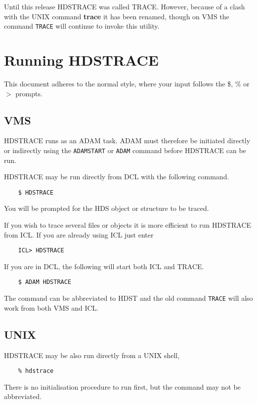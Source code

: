 Until this release {\footnotesize HDSTRACE} was called {\footnotesize
TRACE}. However, because of a clash with the UNIX command {\bf trace} it
has been renamed, though on VMS the command {\tt TRACE} will continue to
invoke this utility. 


\section{Running HDSTRACE}
This document adheres to the normal style, where your input follows
the \$, \% or $>$ prompts.

\subsection{VMS}
{\footnotesize HDSTRACE} runs as an {\footnotesize ADAM} task.
{\footnotesize ADAM} must
therefore be initiated directly or indirectly using the {\tt ADAMSTART}
or {\tt ADAM} command before {\footnotesize HDSTRACE} can be run. 

{\footnotesize HDSTRACE} may be run directly from DCL with the following 
command.
\small
\begin{verbatim}
    $ HDSTRACE
\end{verbatim}
\normalsize
You will be prompted for the HDS object or structure to be traced.

If you wish to trace several files or objects 
it is more efficient to run {\footnotesize HDSTRACE} from ICL.
If you are already using ICL just enter

\small
\begin{verbatim}
    ICL> HDSTRACE
\end{verbatim}
If you are in DCL, the following will start both ICL and {\footnotesize
TRACE}.
\begin{verbatim}
    $ ADAM HDSTRACE
\end{verbatim}
\normalsize
The command can be abbreviated to HDST and the old command {\tt TRACE}
will also work from both VMS and ICL.

\subsection{UNIX}
{\footnotesize HDSTRACE} may be also run directly from a UNIX shell,
\small
\begin{verbatim}
    % hdstrace
\end{verbatim}
\normalsize
There is no initialisation procedure to run first, but the command may 
not be abbreviated.

